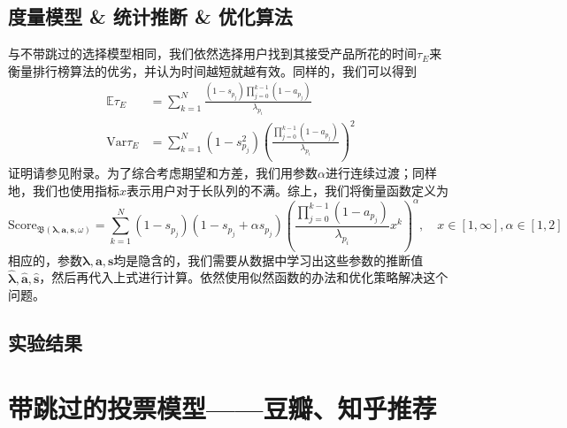 \documentclass[UTF8]{ctexart}
\theoremstyle{plain}
\theoremstyle{definition}
\theoremstyle{remark}
\begin{document}
	\subsection{度量模型 \& 统计推断 \& 优化算法}
	与不带跳过的选择模型相同，我们依然选择用户找到其接受产品所花的时间$\tau_E$来衡量排行榜算法的优劣，并认为时间越短就越有效。同样的，我们可以得到
	\begin{equation} \label{EQ_B}
	\begin{aligned}
	\mathbb{E} \tau_E & = \sum_{k=1}^N \frac{(1-s_{p_j})\prod\limits_{j=0}^{k-1}(1-a_{p_j})}{\lambda_{p_i}} \\
	\mathrm{Var} \tau_E & = \sum_{k=1}^N (1-s_{p_j}^2)\left(\frac{\prod\limits_{j=0}^{k-1}(1-a_{p_j})}{\lambda_{p_i}}\right)^2
	\end{aligned}
	\end{equation}
	证明请参见附录。为了综合考虑期望和方差，我们用参数$\alpha$进行连续过渡；同样地，我们也使用指标$x$表示用户对于长队列的不满。综上，我们将衡量函数定义为
	\begin{equation}
	\mathrm{Score}_{\mathfrak{B}\left(\bm{\lambda}, \bm{a}, \bm{s}, \omega\right)} = \sum_{k=1}^N (1-s_{p_j})(1-s_{p_j}+\alpha s_{p_j})\left(\frac{\prod\limits_{j=0}^{k-1}(1-a_{p_j})}{\lambda_{p_i}} x^k\right)^\alpha, \quad x \in [1, \infty], \alpha \in [1, 2]
	\end{equation}
	相应的，参数$\bm{\lambda}, \bm{a}, \bm{s}$均是隐含的，我们需要从数据中学习出这些参数的推断值$\bm{\hat{\lambda}}, \bm{\hat{a}}, \bm{\hat{s}}$，然后再代入上式进行计算。依然使用似然函数的办法和优化策略解决这个问题。
	\subsection{实验结果}
	\section{带跳过的投票模型——豆瓣、知乎推荐}
\end{document}
